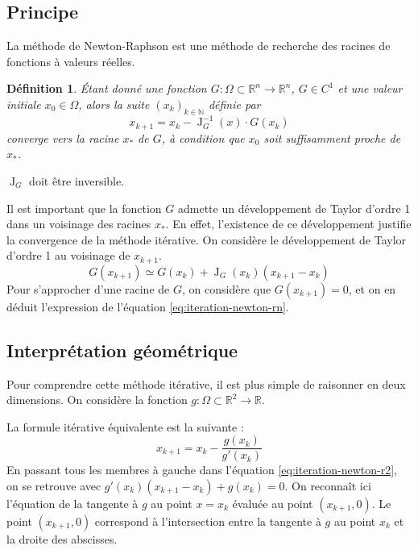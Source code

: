 \documentclass[3p, twocolumn]{elsarticle}
\DeclareMathOperator{\Jacobian}{J}
\newtheorem{definition}{Définition}[section]
\begin{document}
\subsection{Principe}
La méthode de Newton-Raphson est une méthode de recherche des racines de fonctions à valeurs réelles.
\begin{definition}
    Étant donné une fonction $G: \Omega\subset\mathbb{R}^n\longrightarrow \mathbb{R}^n$, $G\in C^1$ et une valeur initiale $x_0\in \Omega$, alors la suite $(x_k)_{k\in \mathbb{N}}$ définie par
    \begin{equation}
        x_{k+1} = x_k - \Jacobian^{-1}_G(x)\cdot G(x_k)
        \label{eq:iteration-newton-rn}
    \end{equation}
    converge vers la racine $x_*$ de $G$, à condition que $x_0$ soit suffisamment proche de $x_*$.
\end{definition}
\begin{rmk}
    $\Jacobian_G$ doit être inversible.
\end{rmk}
\begin{rmk}
    Il est important que la fonction $G$ admette un développement de Taylor d'ordre 1 dans un voisinage des racines $x_*$. En effet, l'existence de ce développement justifie la convergence de la méthode itérative.
    On considère le développement de Taylor d'ordre 1 au voisinage de $x_{k+1}$.
    \begin{equation*}
        G(x_{k+1})\simeq G(x_k)+\Jacobian_G(x_k)(x_{k+1}-x_k)
    \end{equation*}
    Pour s'approcher d'une racine de $G$, on considère que $G(x_{k+1})=0$, et on en déduit l'expression de l'équation \ref{eq:iteration-newton-rn}.
\end{rmk}

\subsection{Interprétation géométrique}
Pour comprendre cette méthode itérative, il est plus simple de raisonner en deux dimensions. On considère la fonction $g :\Omega\subset\mathbb R^2 \rightarrow \mathbb R$.

La formule itérative équivalente est la suivante :
\begin{equation}
    x_{k+1}=x_k-\frac{g(x_k)}{g'(x_k)}
    \label{eq:iteration-newton-r2}
\end{equation}
En passant tous les membres à gauche dans l'équation \ref{eq:iteration-newton-r2}, on se retrouve avec $g'(x_k)(x_{k+1}-x_k)+g(x_k)=0$. On reconnaît ici l'équation de la tangente à $g$ au point $x=x_k$ évaluée au point $(x_{k+1},0)$.
Le point $(x_{k+1},0)$ correspond à l'intersection entre la tangente à $g$ au point $x_k$ et la droite des abscisses.
\end{document}
